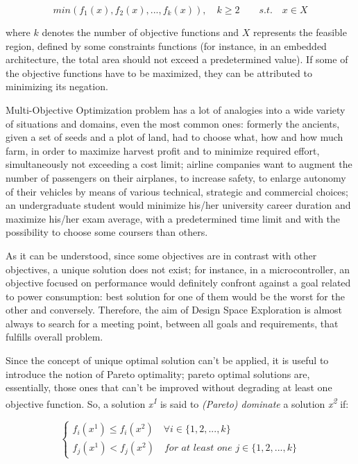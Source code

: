 \begin{equation}
        min( f_1(x), f_2(x), ..., f_k(x) ), \quad k \ge 2 \qquad s.t. \quad x \in X
\end{equation}

where $k$ denotes the number of objective functions and $X$ represents the feasible region, defined by some constraints functions (for instance, in an embedded architecture, the total area should not exceed a predetermined value). If some of the objective functions have to be maximized, they can be attributed to minimizing its negation.

Multi-Objective Optimization problem has a lot of analogies into a wide variety of situations and domains, even the most common ones: formerly the ancients, given a set of seeds and a plot of land, had to choose what, how and how much farm, in order to maximize harvest profit and to minimize required effort, simultaneously not exceeding a cost limit; airline companies want to augment the number of passengers on their airplanes, to increase safety, to enlarge autonomy of their vehicles by means of various technical, strategic and commercial choices; an undergraduate student would minimize his/her university career duration and maximize his/her exam average, with a predetermined time limit and with the possibility to choose some coursers than others.

As it can be understood, since some objectives are in contrast with other objectives, a unique solution does not exist; for instance, in a microcontroller, an objective focused on performance would definitely confront against a goal related to power consumption: best solution for one of them would be the worst for the other and conversely. Therefore, the aim of Design Space Exploration is almost always to search for a meeting point, between all goals and requirements, that fulfills overall problem.

Since the concept of unique optimal solution can't be applied, it is useful to introduce the notion of Pareto optimality; pareto optimal solutions are, essentially, those ones that can't be improved without degrading at least one objective function. So, a solution \textit{x\textsuperscript{1}} is said to \textit{(Pareto) dominate} a solution \textit{x\textsuperscript{2}} if:

\begin{equation}
\begin{cases}
        f_i(x^1) \le f_i(x^2) \quad \forall i \in \{1, 2, ..., k\} \\
        f_j(x^1) < f_j(x^2) \quad \textit{for at least one } j \in \{1, 2, ..., k\}
\end{cases}
\end{equation}

